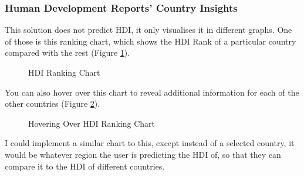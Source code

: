 \documentclass[12pt]{report}
\begin{document}
\subsubsection{Human Development Reports' Country Insights \cite{existingSol3}}
This solution does not predict HDI, it only visualises it in different graphs. One of those is this ranking chart, which shows the HDI Rank of a particular country compared with the rest (Figure \ref{fig:es3a}).
\begin{figure}[H]
\centering
{}
\caption{HDI Ranking Chart}\label{fig:es3a}
\end{figure}
You can also hover over this chart to reveal additional information for each of the other countries (Figure \ref{fig:es3b}).
\begin{figure}[H]
\centering
{}
\caption{Hovering Over HDI Ranking Chart}\label{fig:es3b}
\end{figure}
I could implement a similar chart to this, except instead of a selected country, it would be whatever region the user is predicting the HDI of, so that they can compare it to the HDI of different countries.
\end{document}
